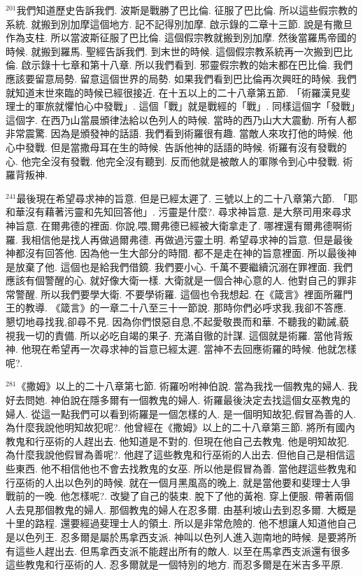 \documentclass{book}
\begin{document}
$^{201}$我們知道歷史告訴我們.
波斯是戰勝了巴比倫.
征服了巴比倫.
所以這些假宗教的系統.
就搬到別加摩這個地方.
記不記得別加摩.
啟示錄的二章十三節.
說是有撒旦作為支柱.
所以當波斯征服了巴比倫.
這個假宗教就搬到別加摩.
然後當羅馬帝國的時候.
就搬到羅馬.
聖經告訴我們.
到末世的時候.
這個假宗教系統再一次搬到巴比倫.
啟示錄十七章和第十八章.
所以我們看到.
邪靈假宗教的始末都在巴比倫.
我們應該要留意局勢.
留意這個世界的局勢.
如果我們看到巴比倫再次興旺的時候.
我們就知道末世來臨的時候已經很接近.
在十五以上的二十八章第五節.
「術羅漢見斐理士的軍旅就懼怕心中發戰」.
這個「戰」就是戰經的「戰」.
同樣這個字「發戰」這個字.
在西乃山當晨頒律法給以色列人的時候.
當時的西乃山大大震動.
所有人都非常震驚.
因為是頒發神的話語.
我們看到術羅很有趣.
當敵人來攻打他的時候.
他心中發戰.
但是當撒母耳在生的時候.
告訴他神的話語的時候.
術羅有沒有發戰的心.
他完全沒有發戰.
他完全沒有聽到.
反而他就是被敵人的軍隊令到心中發戰.
術羅背叛神.

$^{241}$最後現在希望尋求神的旨意.
但是已經太遲了.
三號以上的二十八章第六節.
「耶和華沒有藉著污靈和先知回答他」.
污靈是什麼?.
尋求神旨意.
是大祭司用來尋求神旨意.
在爾弗德的裡面.
你說,喂,爾弗德已經被大衛拿走了.
哪裡還有爾弗德啊術羅.
我相信他是找人再做過爾弗德.
再做過污靈土明.
希望尋求神的旨意.
但是最後神都沒有回答他.
因為他一生大部分的時間.
都不是走在神的旨意裡面.
所以最後神是放棄了他.
這個也是給我們借鏡.
我們要小心.
千萬不要繼續沉溺在罪裡面.
我們應該有個警醒的心.
就好像大衛一樣.
大衛就是一個合神心意的人.
他對自己的罪非常警醒.
所以我們要學大衛.
不要學術羅.
這個也令我想起.
在《箴言》裡面所羅門王的教導.
《箴言》的一章二十八至三十一節說.
那時你們必呼求我,我卻不答應.
懇切地尋找我,卻尋不見.
因為你們恨惡自息,不起愛敬畏而和華.
不聽我的勸誡,藐視我一切的責備.
所以必吃自竭的果子.
充滿自徹的計謀.
這個就是術羅.
當他背叛神.
他現在希望再一次尋求神的旨意已經太遲.
當神不去回應術羅的時候.
他就怎樣呢?.

$^{281}$《撒姆》以上的二十八章第七節.
術羅吩咐神伯說.
當為我找一個教鬼的婦人.
我好去問她.
神伯說在隱多爾有一個教鬼的婦人.
術羅最後決定去找這個女巫教鬼的婦人.
從這一點我們可以看到術羅是一個怎樣的人.
是一個明知故犯,假冒為善的人.
為什麼我說他明知故犯呢?.
他曾經在《撒姆》以上的二十八章第三節.
將所有國內教鬼和行巫術的人趕出去.
他知道是不對的.
但現在他自己去教鬼.
他是明知故犯.
為什麼我說他假冒為善呢?.
他趕了這些教鬼和行巫術的人出去.
但他自己是相信這些東西.
他不相信他也不會去找教鬼的女巫.
所以他是假冒為善.
當他趕這些教鬼和行巫術的人出以色列的時候.
就在一個月黑風高的晚上.
就是當他要和斐理士人爭戰前的一晚.
他怎樣呢?.
改變了自己的裝束.
脫下了他的黃袍.
穿上便服.
帶著兩個人去見那個教鬼的婦人.
那個教鬼的婦人在忍多爾.
由基利坡山去到忍多爾.
大概是十里的路程.
還要經過斐理士人的領土.
所以是非常危險的.
他不想讓人知道他自己是以色列王.
忍多爾是屬於馬拿西支派.
神叫以色列人進入迦南地的時候.
是要將所有這些人趕出去.
但馬拿西支派不能趕出所有的敵人.
以至在馬拿西支派還有很多這些教鬼和行巫術的人.
忍多爾就是一個特別的地方.
而忍多爾是在米吉多平原.
\end{document}
